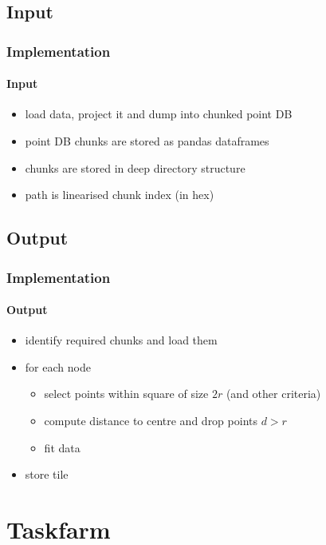 \subsection{Input}
\begin{frame}[<+->]
  \frametitle{Implementation}
  \framesubtitle{Input}
  \begin{itemize}
  \item load data, project it and dump into chunked point DB
  \item point DB chunks are stored as pandas dataframes
  \item chunks are stored in deep directory structure
  \item path is linearised chunk index (in hex)
  \end{itemize}
\end{frame}


\subsection{Output}
\begin{frame}[<+->]
  \frametitle{Implementation}
  \framesubtitle{Output}
  \begin{itemize}
  \item identify required chunks and load them
  \item for each node
    \begin{itemize}
    \item select points within square of size $2r$ (and other criteria)
    \item compute distance to centre and drop points $d>r$
    \item fit data
    \end{itemize}
  \item store tile
  \end{itemize}
\end{frame}

\section{Taskfarm}

